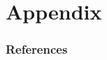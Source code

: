 	\appendix
	
	\section*{Appendix}
	
	
	\begin{frame}[allowframebreaks=1]
		\frametitle{References}
		\printbibliography
	\end{frame}
